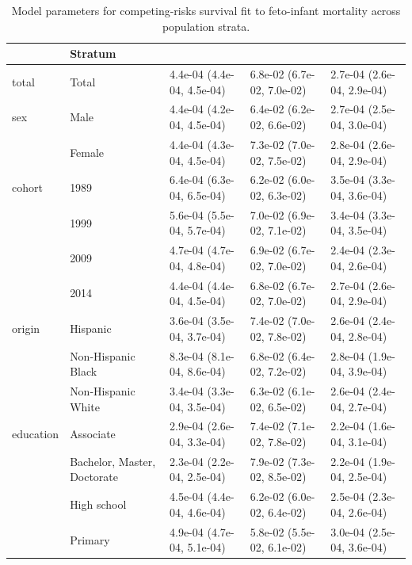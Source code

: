 \begin{table}[t]
\caption*{
{\fontsize{20}{25}\selectfont  Model parameters for competing-risks survival fit to feto-infant mortality across population strata.\fontsize{12}{15}\selectfont }
} 
\fontsize{12.0pt}{14.0pt}\selectfont
\begin{tabular*}{\linewidth}{@{\extracolsep{\fill}}lllll}
\toprule
 & Stratum &  &  &  \\ 
\midrule\addlinespace[2.5pt]
total & Total & 4.4e-04 (4.4e-04, 4.5e-04) & 6.8e-02 (6.7e-02, 7.0e-02) & 2.7e-04 (2.6e-04, 2.9e-04) \\ 
sex & Male & 4.4e-04 (4.2e-04, 4.5e-04) & 6.4e-02 (6.2e-02, 6.6e-02) & 2.7e-04 (2.5e-04, 3.0e-04) \\ 
 & Female & 4.4e-04 (4.3e-04, 4.5e-04) & 7.3e-02 (7.0e-02, 7.5e-02) & 2.8e-04 (2.6e-04, 2.9e-04) \\ 
cohort & 1989 & 6.4e-04 (6.3e-04, 6.5e-04) & 6.2e-02 (6.0e-02, 6.3e-02) & 3.5e-04 (3.3e-04, 3.6e-04) \\ 
 & 1999 & 5.6e-04 (5.5e-04, 5.7e-04) & 7.0e-02 (6.9e-02, 7.1e-02) & 3.4e-04 (3.3e-04, 3.5e-04) \\ 
 & 2009 & 4.7e-04 (4.7e-04, 4.8e-04) & 6.9e-02 (6.7e-02, 7.0e-02) & 2.4e-04 (2.3e-04, 2.6e-04) \\ 
 & 2014 & 4.4e-04 (4.4e-04, 4.5e-04) & 6.8e-02 (6.7e-02, 7.0e-02) & 2.7e-04 (2.6e-04, 2.9e-04) \\ 
origin & Hispanic & 3.6e-04 (3.5e-04, 3.7e-04) & 7.4e-02 (7.0e-02, 7.8e-02) & 2.6e-04 (2.4e-04, 2.8e-04) \\ 
 & Non-Hispanic Black & 8.3e-04 (8.1e-04, 8.6e-04) & 6.8e-02 (6.4e-02, 7.2e-02) & 2.8e-04 (1.9e-04, 3.9e-04) \\ 
 & Non-Hispanic White & 3.4e-04 (3.3e-04, 3.5e-04) & 6.3e-02 (6.1e-02, 6.5e-02) & 2.6e-04 (2.4e-04, 2.7e-04) \\ 
education & Associate & 2.9e-04 (2.6e-04, 3.3e-04) & 7.4e-02 (7.1e-02, 7.8e-02) & 2.2e-04 (1.6e-04, 3.1e-04) \\ 
 & Bachelor, Master, Doctorate & 2.3e-04 (2.2e-04, 2.5e-04) & 7.9e-02 (7.3e-02, 8.5e-02) & 2.2e-04 (1.9e-04, 2.5e-04) \\ 
 & High school & 4.5e-04 (4.4e-04, 4.6e-04) & 6.2e-02 (6.0e-02, 6.4e-02) & 2.5e-04 (2.3e-04, 2.6e-04) \\ 
 & Primary & 4.9e-04 (4.7e-04, 5.1e-04) & 5.8e-02 (5.5e-02, 6.1e-02) & 3.0e-04 (2.5e-04, 3.6e-04) \\ 
\bottomrule
\end{tabular*}
\end{table}

